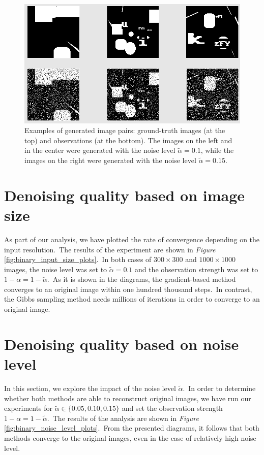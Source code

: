 \documentclass[shortabstract, english, lic]{iithesis}
\theoremstyle{default_theorem_style}\newtheorem{theorem}{Theorem}
\theoremstyle{default_theorem_style}\newtheorem{definition}{Definition}
\begin{document}
\begin{figure}[H]
\centering
\includegraphics[scale=0.475]{binary_data_examples}
\caption{Examples of generated image pairs: ground-truth images (at the top) and observations (at the bottom).
The images on the left and in the center were generated with the noise level $\tilde{\alpha} = 0.1$, while the
images on the right were generated with the noise level $\tilde{\alpha} = 0.15$.}
\label{fig:binary_data_examples}
\end{figure}

\section{Denoising quality based on image size}

As part of our analysis, we have plotted the rate of convergence depending on the input resolution.\ The
results of the experiment are shown in \textit{Figure} \ref{fig:binary_input_size_plots}.\ In
both cases of $300{\times}300$ and $1000{\times}1000$ images, the noise level was set to $\tilde{\alpha} = 0.1$
and the observation strength was set to $1 - \alpha = 1 - \tilde{\alpha}$.\ As it is shown in the diagrams,
the gradient-based method converges to an original image within one hundred thousand steps.\ In contrast,
the Gibbs sampling method needs millions of iterations in order to converge to an original image.

\section{Denoising quality based on noise level}

In this section, we explore the impact of the noise level $\tilde{\alpha}$.\ In order to determine whether both
methods are able to reconstruct original images, we have run our experiments for
$\tilde{\alpha} \in \{0.05, 0.10, 0.15\}$ and set the observation strength $1 - \alpha = 1 - \tilde{\alpha}$.\ The
results of the analysis are shown in \textit{Figure} \ref{fig:binary_noise_level_plots}.\ From the presented
diagrams, it follows that both methods converge to the original images, even in the case of relatively high noise
level.\newline\newline\newline\newline
\end{document}

